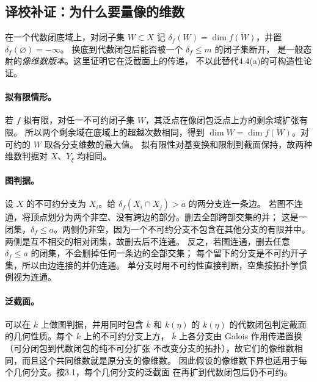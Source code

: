 \endgroup


\hypertarget{D18-093-notes}{}
\begingroup
\def\OO{\mathcal O}\def\FF{\mathcal F}\def\GG{\mathcal G}
\def\PP{\mathbf P}\def\calP{\mathcal P}\def\dd{\delta}
\def\Div{\operatorname{Div}}\def\depth{\operatorname{depth}}
\def\pr{\operatorname{pr}}\def\coker{\operatorname{coker}}
\subsection*{译校补证：为什么要量像的维数}
在一个代数闭底域上，对闭子集 $W\subset X$ 记
$\dd_f(W)=\dim\overline{f(W)}$，并置 $\dd_f(\varnothing)=-\infty$。
换底到代数闭包后能否被一个 $\dd_f\leq m$ 的闭子集断开，
是一般态射的\emph{像维数版本}。这里证明它在泛截面上的传递，
不以此替代4.4(a)的可构造性论证。

\paragraph{拟有限情形。}
若 $f$ 拟有限，对任一不可约闭子集 $W$，其泛点在像闭包泛点上方的剩余域扩张有限。
所以两个剩余域在底域上的超越次数相同，得到
$\dim W=\dim\overline{f(W)}$。对可约的 $W$ 取各分支维数的最大值。
拟有限性对基变换和限制到截面保持，故两种维数判据对 $X$、$Y_\xi$ 均相同。

\paragraph{图判据。}
设 $X$ 的不可约分支为 $X_i$。给 $\dd_f(X_i\cap X_j)>a$ 的两分支连一条边。
若图不连通，将顶点划分为两个非空、没有跨边的部分。删去全部跨部交集的并；
这是一闭集，$\dd_f\leq a$。两侧仍非空，因为一个不可约分支不包含在其他分支的有限并中。
两侧是互不相交的相对闭集，故删去后不连通。
反之，若图连通，删去任意 $\dd_f\leq a$ 的闭集，不会删掉任何一条边的全部交集；
每个留下的分支是不可约开子集，所以由边连接的并仍连通。
单分支时用不可约性直接判断，空集按拓扑学惯例视为连通。

\paragraph{泛截面。}
可以在 $\overline k$ 上做图判据，并用同时包含 $\overline k$ 和 $k(\eta)$
的 $k(\eta)$ 的代数闭包判定截面的几何性质。每个 $k$ 上的不可约分支上方，
$\overline k$ 上各分支由 Galois 作用传递置换（可分闭包到代数闭包的纯不可分扩张
不改变分支的拓扑），故它们的像维数相同，而且这个共同维数就是原分支的像维数。
因此假设的像维数下界也适用于每个几何分支。按3.1，每个几何分支的泛截面
在再扩到代数闭包后仍不可约。

